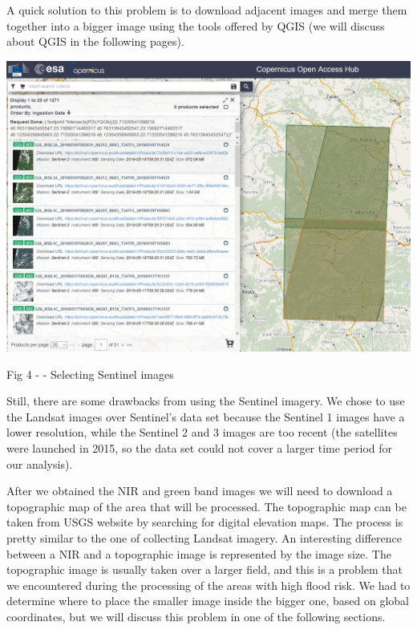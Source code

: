 \documentclass[12pt, a4paper]{report}
\begin{document}
A quick solution to this problem is to download adjacent images and merge them together into a bigger image using the tools offered by QGIS (we will discuss about QGIS in the following pages).

\newpage
\bigskip

\includegraphics[scale=0.54, center]{sentinel.png} 
\begin{center}
Fig 4 - \cite{Copernicus} - Selecting Sentinel images
\end{center}
\par 


Still, there are some drawbacks from using the Sentinel imagery. We chose to use the Landsat images over Sentinel's data set because the Sentinel 1 images have a lower resolution, while the Sentinel 2 and 3 images are too recent (the satellites were launched in 2015, so the data set could not cover a larger time period for our analysis).
\par 

After we obtained the NIR and green band images we will need to download a topographic map of the area that will be processed. The topographic map can be taken from USGS website by searching for digital elevation maps. The process is pretty similar to the one of collecting Landsat imagery. An interesting difference between a NIR and a topographic image is represented by the image size. The topographic image is usually taken over a larger field, and this is a problem that we encountered during the processing of the areas with high flood risk. We had to determine where to place the smaller image inside the bigger one, based on global coordinates, but we will discuss this problem in one of the following sections.
\par
\end{document}
